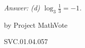 
{\it Answer: (d) $\displaystyle \log_3 \frac{1}{3}=-1$.}

\medskip
by Project MathVote

SVC.01.04.057


